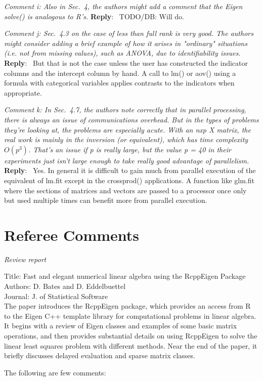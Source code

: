\documentclass[10pt]{article}
\newcommand{\pointRaised}[2]{\smallskip %
  \textsl{{\fontseries{b}\selectfont #1}: #2}\newline}
\newcommand{\reply}[1]{\textbf{Reply}:\ #1 \smallskip } %
\begin{document}
\pointRaised{Comment i}{
  Also in Sec.~4, the authors might add a comment that the Eigen
  solve() is analogous to R's.
}
\reply{
  TODO/DB: Will do.
}


\pointRaised{Comment j}{
  Sec.~4.3 on the case of less than full rank is very good. The
  authors might consider adding a brief example of how it arises in 
  "ordinary" situations (i.e. not from missing values), such as ANOVA, due
  to identifiability issues.
}
\reply{
  But that is not the case unless the user has constructed the
  indicator columns and the intercept column by hand.  A call to lm()
  or aov() using a formula with categorical variables applies
  contrasts to the indicators when appropriate.
}


\pointRaised{Comment k}{
  In Sec.~4.7, the authors note correctly that in parallel processing,
  there is always an issue of communications overhead. But in the types
  of problems they're looking at, the problems are especially acute. With
  an nxp X matrix, the real work is mainly in the inversion (or
  equivalent), which has time complexity $O(p^3)$. That's an issue if p is
  really large, but the value p = 40 in their experiments just isn't large
  enough to take really good advantage of parallelism.
}
\reply{
  Yes.  In general it is difficult to gain much from parallel
  execution of the equivalent of lm.fit except in the crossprod()
  applications.  A function like glm.fit where the sections of
  matrices and vectors are passed to a processor once only but used
  multiple times can benefit more from parallel execution.
}


\section*{Referee Comments}

{ \sl
  Review report

  Title: Fast and elegant numerical linear algebra using the RcppEigen Package \\
  Authors: D. Bates and D. Eddelbuettel \\
  Journal: J. of Statistical Software \\

  The paper introduces the RcppEigen package, which provides an
  access from R to the Eigen C++ template library for computational
  problems in linear algebra. It begins with a review of Eigen
  classes and examples of some basic matrix operations, and then
  provides substantial details on using RcppEigen to solve the
  linear least squares problem with different methods. Near the end
  of the paper, it briefly discusses delayed evaluation and sparse
  matrix classes. 

  The following are few comments: 
}
\end{document}
